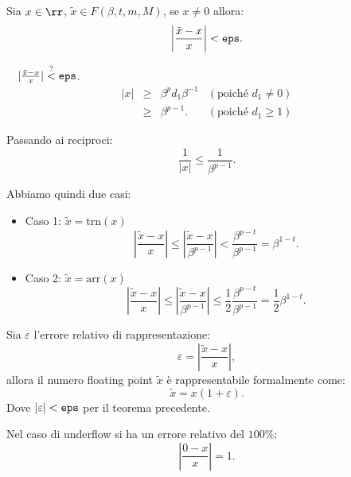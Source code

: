 \begin{teo}
Sia $x \in \rr$, $\tilde{x} \in F(\beta,t,m,M)$, se $x \neq 0$ allora:
\[\left|\frac{\tilde{x} - x}{x}\right| < \verb1eps1.\] 
\end{teo}
\begin{dimo}$\quad |\frac{\tilde{x} - x}{x}| \stackrel{?}{<} \verb1eps1$.
\[\begin{array}{lclr}
|x| & \geq & \beta^p d_1 \beta^{-1} & (\textrm{poiché }d_1 \neq 0) \\
    & \geq & \beta^{p-1}.   & (\textrm{poiché }d_1 \geq 1)
\end{array}\]

Passando ai reciproci:
\[\frac{1}{|x|} \leq \frac{1}{\beta^{p-1} }.\]

Abbiamo quindi due casi: 
\begin{itemize}
\item[]Caso 1: $\tilde{x} = \textrm{trn}(x)$
\[\left|\frac{\tilde{x} - x}{x}\right| \leq 
\left|\frac{\tilde{x} - x}{\beta^{p-1}}\right|
< \frac{\beta^{p-t}}{\beta^{p-1}} = \beta^{1-t}.\]
\item[]Caso 2: $\tilde{x} = \textrm{arr}(x)$
\[\left|\frac{\tilde{x} - x}{x}\right| \leq 
\left|\frac{\tilde{x} - x}{\beta^{p-1}}\right|
\leq \frac{1}{2}\frac{\beta^{p-t}}{\beta^{p-1}} = \frac{1}{2}\beta^{1-t}.\]
\end{itemize}
\end{dimo}

\begin{cor}
Sia $\varepsilon$ l'errore relativo di rappresentazione:
\[\varepsilon = \left|\frac{\tilde{x} - x}{x}\right|,\]
allora il numero floating point $\tilde{x}$ è rappresentabile formalmente
come:
\[\tilde{x} = x(1 + \varepsilon).\]
Dove $|\varepsilon| < \verb1eps1$ per il teorema precedente.
\end{cor}

\begin{osse}
Nel caso di underflow si ha un errore relativo del $100\%$:
\[\left|\frac{0 - x}{x}\right| = 1.\]
\end{osse}


